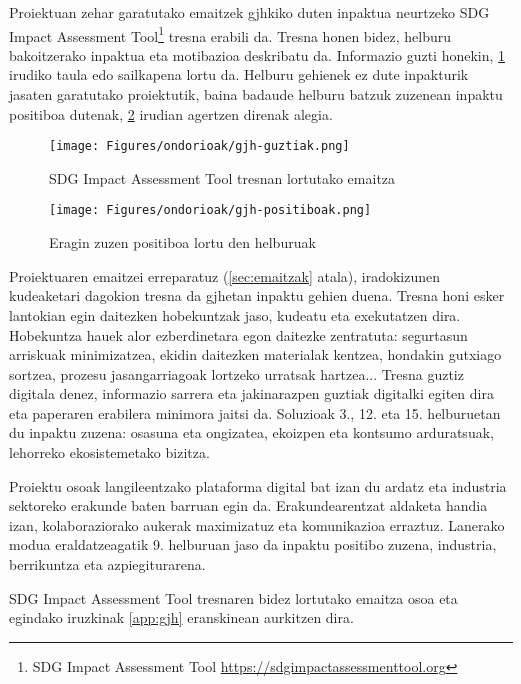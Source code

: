 Proiektuan zehar garatutako emaitzek \acrshort{gjh}kiko duten inpaktua neurtzeko SDG Impact Assessment Tool\footnote{SDG Impact Assessment Tool \url{https://sdgimpactassessmenttool.org}}  tresna erabili da. Tresna honen bidez, helburu bakoitzerako inpaktua eta motibazioa deskribatu da. Informazio guzti honekin, \ref{gjh-guztiak} irudiko taula edo sailkapena lortu da. Helburu gehienek ez dute inpakturik jasaten garatutako proiektutik, baina badaude helburu batzuk zuzenean inpaktu positiboa dutenak, \ref{gjh-positiboak} irudian agertzen direnak alegia.

\begin{figure}[H]
\centering
\texttt{[image: Figures/ondorioak/gjh-guztiak.png]}
\caption{SDG Impact Assessment Tool tresnan lortutako emaitza}
\label{gjh-guztiak}
\end{figure}

\begin{figure}[H]
\centering
\texttt{[image: Figures/ondorioak/gjh-positiboak.png]}
\caption{Eragin zuzen positiboa lortu den helburuak}
\label{gjh-positiboak}
\end{figure}

Proiektuaren emaitzei erreparatuz (\ref{sec:emaitzak} atala), iradokizunen kudeaketari dagokion tresna da \acrshort{gjh}etan inpaktu gehien duena. Tresna honi esker lantokian egin daitezken hobekuntzak jaso, kudeatu eta exekutatzen dira. Hobekuntza hauek alor ezberdinetara egon daitezke zentratuta: segurtasun arriskuak minimizatzea, ekidin daitezken materialak kentzea, hondakin gutxiago sortzea, prozesu jasangarriagoak lortzeko urratsak hartzea... Tresna guztiz digitala denez, informazio sarrera eta jakinarazpen guztiak digitalki egiten dira eta paperaren erabilera minimora jaitsi da. Soluzioak 3., 12. eta 15. helburuetan du inpaktu zuzena: osasuna eta ongizatea, ekoizpen eta kontsumo arduratsuak, lehorreko ekosistemetako bizitza. 

Proiektu osoak langileentzako plataforma digital bat izan du ardatz eta industria sektoreko erakunde baten barruan egin da. Erakundearentzat aldaketa handia izan, kolaboraziorako aukerak maximizatuz eta komunikazioa erraztuz. Lanerako modua eraldatzeagatik 9. helburuan jaso da inpaktu positibo zuzena, industria, berrikuntza eta azpiegiturarena. 



SDG Impact Assessment Tool tresnaren bidez lortutako emaitza osoa eta egindako iruzkinak \ref{app:gjh} eranskinean aurkitzen dira. 